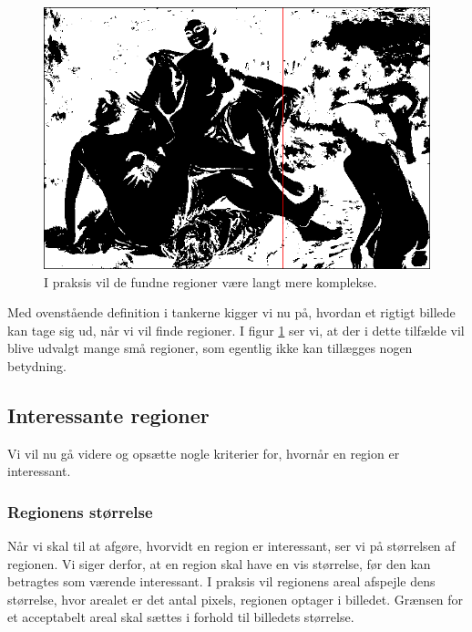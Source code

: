 {\begin{figure}[p]
    \begin{center}
        \includegraphics[scale=0.42,angle=0]{afsnit/vores_implementation/billeder/naiv_algoritme/bathers_mockup_blob}
    \end{center}
    \caption[Interessante regioner i praksis]{I praksis vil de
    fundne regioner være langt mere komplekse.}
    \label{realworld_example}
\end{figure}

Med ovenstående definition i tankerne kigger vi nu på, hvordan et
rigtigt billede kan tage sig ud, når vi vil finde regioner. I figur
\ref{realworld_example} ser vi, at der i dette tilfælde vil blive
udvalgt mange små regioner, som egentlig ikke kan tillægges nogen
betydning.

\subsection{Interessante regioner}
Vi vil nu gå videre og opsætte nogle kriterier for, hvornår en region er
interessant.

\subsubsection{Regionens størrelse}
Når vi skal til at afgøre, hvorvidt en region er interessant, ser vi på
størrelsen af regionen.  Vi siger derfor, at en region skal have en vis
størrelse, før den kan betragtes som værende interessant. I praksis vil
regionens areal afspejle dens størrelse, hvor arealet er det antal
pixels, regionen optager i billedet.  Grænsen for et acceptabelt areal
skal sættes i forhold til billedets størrelse.

}
